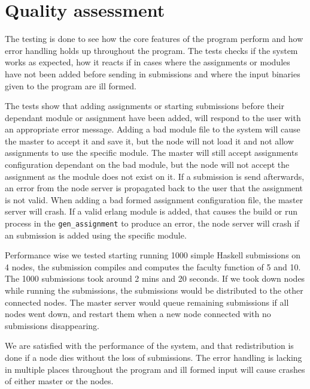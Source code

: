 \chapter{Quality assessment}
The testing is done to see how the core features of the program perform and how error handling holds up throughout the program. The tests checks if the system works as expected, how it reacts if in cases where the assignments or modules have not been added before sending in submissions and where the input binaries given to the program are ill formed.

The tests show that adding assignments or starting submissions before their dependant module or assignment have been added, will respond to the user with an appropriate error message. Adding a bad module file to the system will cause the master to accept it and save it, but the node will not load it and not allow assignments to use the specific module. The master will still accept assignments configuration dependant on the bad module, but the node will not accept the assignment as the module does not exist on it. If a submission is send afterwards, an error from the node server is propagated back to the user that the assignment is not valid. When adding a bad formed assignment configuration file, the master server will crash. If a valid erlang module is added, that causes the build or run process in the \texttt{gen\_assignment} to produce an error, the node server will crash if an submission is added using the specific module.

Performance wise we tested starting running 1000 simple Haskell submissions on 4 nodes, the submission compiles and computes the faculty function of 5 and 10. The 1000 submissions took around 2 mins and 20 seconds. If we took down nodes while running the submissions, the submissions would be distributed to the other connected nodes. The master server would queue remaining submissions if all nodes went down, and restart them when a new node connected with no submissions disappearing.

We are satisfied with the performance of the system, and that redistribution is done if a node dies without the loss of submissions. The error handling is lacking in multiple places throughout the program and ill formed input will cause crashes of either master or the nodes.

